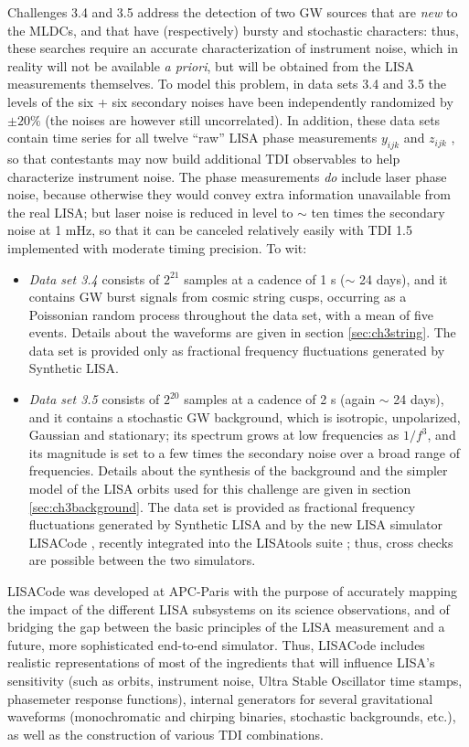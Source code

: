 \documentclass{iopart}
\begin{document}
Challenges 3.4 and 3.5 address the detection of two GW sources that are \emph{new} to the MLDCs, and that have (respectively) bursty and stochastic characters: thus, these searches require an accurate characterization of instrument noise, which in reality will not be available \emph{a priori}, but will be obtained from the LISA measurements themselves.
To model this problem, in data sets 3.4 and 3.5 the levels of the six + six secondary noises have been independently randomized by $\pm 20 \%$ (the noises are however still uncorrelated). In addition, these data sets contain time series for all twelve ``raw'' LISA phase measurements $y_{ijk}$ and $z_{ijk}$ \cite{synthlisa}, so that contestants may now build additional TDI observables to help characterize instrument noise. The phase measurements \emph{do} include laser phase noise, because otherwise they would convey extra information unavailable from the real LISA; but laser noise is reduced in level to $\sim$ ten times the secondary noise at 1 mHz, so that it can be canceled relatively easily with TDI 1.5 implemented with moderate timing precision.
To wit:
%
\begin{itemize}
%
\item \textit{Data set 3.4} consists of $2^{21}$ samples at a cadence of 1 s ($\sim$ 24 days), and it contains GW burst signals from cosmic string cusps, occurring as a Poissonian random process throughout the data set, with a mean of five events. Details about the waveforms are given in section \ref{sec:ch3string}. The data set is provided only as fractional frequency fluctuations generated by Synthetic LISA.
%
\item \textit{Data set 3.5} consists of $2^{20}$ samples at a cadence of 2 s (again $\sim$ 24 days), and it contains a stochastic GW background, which is isotropic, unpolarized, Gaussian and stationary; its spectrum grows at low frequencies as $1/f^3$, and its magnitude is set to a few times the secondary noise over a broad range of frequencies. Details about the synthesis of the background and the simpler model of the LISA orbits used for this challenge are given in section \ref{sec:ch3background}. The data set is provided as fractional frequency fluctuations generated by Synthetic LISA and by the new LISA simulator LISACode \cite{lisacode}, recently integrated into the LISAtools suite \cite{lisatools}; thus, cross checks are possible between the two simulators.
%
\end{itemize}
%
LISACode \cite{lisacode} was developed at APC-Paris with the purpose of accurately mapping the impact of the different LISA subsystems on its science observations, and of bridging the gap between the basic principles of the LISA measurement and a future, more sophisticated end-to-end simulator. Thus, LISACode includes realistic representations of most of the ingredients that will influence LISA's sensitivity (such as orbits, instrument noise, Ultra Stable Oscillator time stamps, phasemeter response functions), internal generators for several gravitational waveforms (monochromatic and chirping binaries, stochastic backgrounds, etc.), as well as the construction of various TDI combinations.
\end{document}
